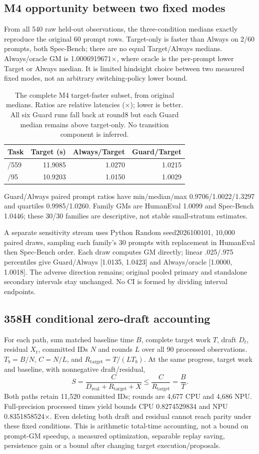 \subsection{M4 opportunity between two fixed modes}
From all 540 raw held-out observations, the three-condition medians exactly reproduce the original 60 prompt rows. Target-only is faster than Always on 2/60 prompts, both Spec-Bench; there are no equal Target/Always medians. Always/oracle GM is 1.0006919671$\times$, where oracle is the per-prompt lower Target or Always median. It is limited hindsight choice between two measured fixed modes, not an arbitrary switching-policy lower bound.
\begin{table}[t]
\caption{The complete M4 target-faster subset, from original medians. Ratios are relative latencies ($\times$); lower is better. All six Guard runs fall back at round8 but each Guard median remains above target-only. No transition component is inferred.}
\label{tab:m4opportunity}
\centering
\begin{tabular}{lrrr}
\toprule
Task & Target (s) & Always/Target & Guard/Target \\
\midrule
/559 & 11.9085 & 1.0270 & 1.0215 \\
/95 & 10.9203 & 1.0150 & 1.0029 \\
\bottomrule
\end{tabular}
\end{table}
Guard/Always paired prompt ratios have min/median/max 0.9706/1.0022/1.3297 and quartiles 0.9985/1.0260. Family GMs are HumanEval 1.0099 and Spec-Bench 1.0446; these 30/30 families are descriptive, not stable small-stratum estimates.

A separate sensitivity stream uses Python Random seed2026100101, 10,000 paired draws, sampling each family's 30 prompts with replacement in HumanEval then Spec-Bench order. Each draw computes GM directly; linear .025/.975 percentiles give Guard/Always [1.0135, 1.0423] and Always/oracle [1.0000, 1.0018]. The adverse direction remains; original pooled primary and standalone secondary intervals stay unchanged. No CI is formed by dividing interval endpoints.

\subsection{358H conditional zero-draft accounting}
For each path, sum matched baseline time $B$, complete target work $T$, draft $D_t$, residual $X_t$, committed IDs $N$ and rounds $L$ over all 90 processed observations. $T_b=B/N$, $C=N/L$, and $R_{\mathrm{target}}=T/(LT_b)$. At the same progress, target work and baseline, with nonnegative draft/residual,
\[
S=\frac{C}{D_{\mathrm{real}}+R_{\mathrm{target}}+X}
\le\frac{C}{R_{\mathrm{target}}}=\frac{B}{T}.
\]
Both paths retain 11,520 committed IDs; rounds are 4,677 CPU and 4,686 NPU. Full-precision processed times yield bounds CPU 0.8274529834 and NPU 0.8351858524$\times$. Even deleting both draft and residual cannot reach parity under these fixed conditions. This is arithmetic total-time accounting, not a bound on prompt-GM speedup, a measured optimization, separable replay saving, persistence gain or a bound after changing target execution/proposals.


